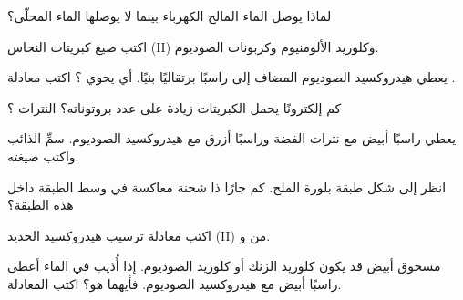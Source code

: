 \begin{exercise}[$\star$]\label{exo:g9:ions:4}
لماذا يوصل الماء المالح الكهرباء بينما لا يوصلها الماء المحلّى؟
\end{exercise}

\begin{exercise}[$\star\star$]\label{exo:g9:ions:5}
اكتب صيغ كبريتات النحاس (II) وكلوريد الألومنيوم وكربونات
الصوديوم.
\end{exercise}

\begin{exercise}[$\star\star$]\label{exo:g9:ions:6}
يعطي هيدروكسيد الصوديوم المضاف إلى  راسبًا برتقاليًا بنيًا. أي 
يحوي ؟ اكتب معادلة .
\end{exercise}

\begin{exercise}[$\star\star$]\label{exo:g9:ions:7}
كم إلكترونًا يحمل  الكبريتات  زيادة على عدد
بروتوناته؟  النترات ؟
\end{exercise}

\begin{exercise}[$\star\star$]\label{exo:g9:ions:8}
يعطي  راسبًا أبيض مع نترات الفضة وراسبًا أزرق مع هيدروكسيد الصوديوم.
سمِّ  الذائب واكتب
صيغته.
\end{exercise}

\begin{exercise}[$\star\star$]\label{exo:g9:ions:9}
انظر إلى شكل طبقة بلورة الملح. كم جارًا ذا شحنة معاكسة  في وسط الطبقة
داخل هذه
الطبقة؟
\end{exercise}

\begin{exercise}[$\star\star$]\label{exo:g9:ions:10}
اكتب معادلة ترسيب هيدروكسيد الحديد (II) من 
 و.
\end{exercise}

\begin{exercise}[$\star\star\star$]\label{exo:g9:ions:11}
مسحوق أبيض قد يكون كلوريد الزنك أو كلوريد الصوديوم. إذا أُذيب في الماء
أعطى راسبًا أبيض مع هيدروكسيد الصوديوم. فأيهما هو؟
اكتب المعادلة.
\end{exercise}

